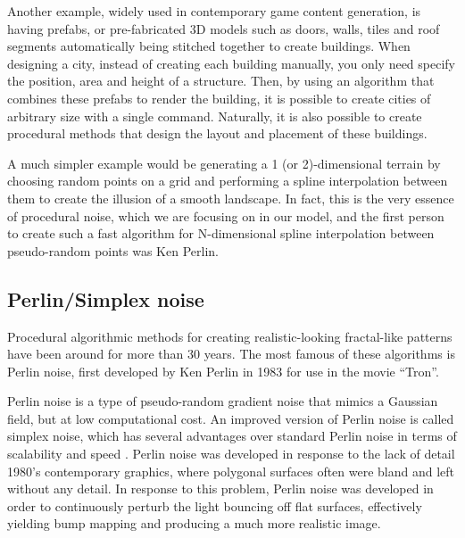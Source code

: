 \documentclass[aps,pre,twocolumn,letterpaper,floatfix,showpacs]{revtex4}
\begin{document}
Another example, widely used in contemporary game content generation, is having prefabs, or
pre-fabricated 3D models such as doors, walls, tiles and roof segments automatically being
stitched together to create buildings.
When designing a city, instead of creating each building manually, you only need specify the
position, area and height of a structure.
Then, by using an algorithm that combines these prefabs to render the building, it is possible
to create cities of arbitrary size with a single command.
Naturally, it is also possible to create procedural methods that design the layout and placement of these buildings.

A much simpler example would be generating a 1 (or 2)-dimensional terrain by choosing random
points on a grid and performing a spline interpolation between them to create the illusion of a smooth landscape.
In fact, this is the very essence of procedural noise, which we are focusing on in our model,
and the first person to create such a fast algorithm for N-dimensional spline interpolation
between pseudo-random points was Ken Perlin\cite{perlin1985image}.

\subsection{Perlin/Simplex noise}
\label{sec:perlin}

Procedural algorithmic methods for creating realistic-looking
fractal-like patterns have been around for more than 30 years. The most famous of these
algorithms is Perlin noise, first developed by Ken Perlin in 1983 for
use in the movie ``Tron''\cite{perlin1985image}. 

Perlin noise is a type of pseudo-random gradient noise that mimics a Gaussian field, but at low computational cost.
An improved version of Perlin noise is called simplex noise, which has several advantages
over standard Perlin noise in terms of scalability and speed \cite{perlin:2002}.
Perlin noise was developed in response to the lack of detail 1980's contemporary graphics,
where polygonal surfaces often were bland and left without any detail.
In response to this problem, Perlin noise was developed in order to continuously perturb
the light bouncing off flat surfaces, effectively yielding bump mapping and producing a much more realistic image.
\end{document}
